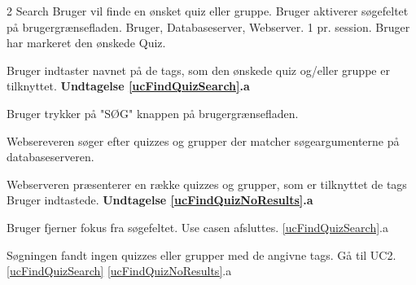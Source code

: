 \uchead
	{2}
	{Search}
	{Bruger vil finde en ønsket quiz eller gruppe.}
	{Bruger aktiverer søgefeltet på brugergrænsefladen.}
	{Bruger, Databaseserver, Webserver.}
	{}
	{}
	{1 pr. session.}
	{Bruger har markeret den ønskede Quiz.}

\item \label{ucFindQuizSearch} Bruger indtaster navnet på de tags, som den ønskede quiz og/eller gruppe er tilknyttet. 
\textbf{Undtagelse \ref{ucFindQuizSearch}.a}
\item Bruger trykker på "SØG" knappen på brugergrænsefladen.
\item Websereveren søger efter quizzes og grupper der matcher søgeargumenterne på databaseserveren.

\item \label{ucFindQuizNoResults} Webserveren præsenterer en række quizzes og grupper, som er tilknyttet de tags Bruger indtastede.
\textbf{Undtagelse \ref{ucFindQuizNoResults}.a}


\ucdescriptionend

\ucextension
	{Bruger fjerner fokus fra søgefeltet.}
	{Use casen afsluttes.}
	{\ref{ucFindQuizSearch}.a}

\ucextension
	{Søgningen fandt ingen quizzes eller grupper med de angivne tags.}
	{Gå til UC2.\ref{ucFindQuizSearch}}
	{\ref{ucFindQuizNoResults}.a}
				
